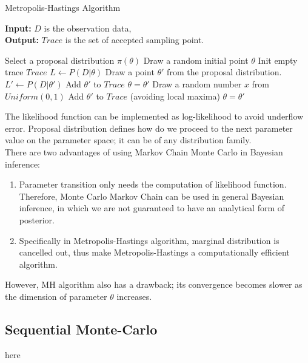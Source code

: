 \begin{algorithm}[H]
      \caption{Metropolis-Hastings Algorithm}\label{mhalg}
      \hspace*{\algorithmicindent} \textbf{Input:} $D$ is the observation data, \\
      \hspace*{\algorithmicindent} \textbf{Output:} $Trace$ is the set of accepted
      sampling point.
      \begin{algorithmic}[1]
            \State Select a proposal distribution $\pi(\theta)$
            \State Draw a random initial point $\theta$
            \State Init empty trace $Trace$
            \State $L \leftarrow P(D|\theta)$
            \State Draw a point $\theta' $ from the proposal distribution.
            \State $L' \leftarrow P(D|\theta')$
            \State Add $\theta'$ to $Trace$
            \State $\theta = \theta'$
            \Else
            \State Draw a random number $x$ from $Uniform(0,1)$
            \State Add $\theta'$ to $Trace$ (avoiding local maxima)
            \State $\theta = \theta'$
            \EndIf
            \EndIf
            \EndWhile
            \EndProcedure
      \end{algorithmic}
\end{algorithm}
The likelihood function can be implemented as log-likelihood to avoid underflow
error. Proposal distribution defines how do we proceed to the next parameter
value on the parameter space; it can be of any distribution family.\\
There are two advantages of using Markov Chain Monte Carlo in Bayesian inference:
\begin{enumerate}
      \item Parameter transition only needs the computation of likelihood function.
            Therefore, Monte Carlo Markov Chain can be used in general Bayesian inference,
            in which we are not guaranteed to have an analytical form of posterior.
      \item Specifically in Metropolis-Hastings algorithm, marginal distribution is
            cancelled out, thus make Metropolis-Hastings a computationally efficient algorithm.
\end{enumerate}
However, MH algorithm also has a drawback; its convergence becomes slower as the
dimension of parameter $\theta$ increases.

\subsection{Sequential Monte-Carlo}
here \cite{daviet2018inference} \cite{silk2012optimizing}
